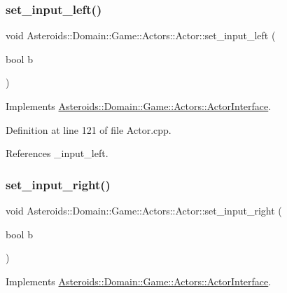 \subsubsection{\texorpdfstring{set\+\_\+input\+\_\+left()}{set\_input\_left()}}
{\footnotesize\ttfamily void Asteroids\+::\+Domain\+::\+Game\+::\+Actors\+::\+Actor\+::set\+\_\+input\+\_\+left (\begin{DoxyParamCaption}\item[{bool}]{b }\end{DoxyParamCaption})\hspace{0.3cm}{\ttfamily [virtual]}}



Implements \hyperlink{classAsteroids_1_1Domain_1_1Game_1_1Actors_1_1ActorInterface_a2871052707d65e47a71da67234fc6f93}{Asteroids\+::\+Domain\+::\+Game\+::\+Actors\+::\+Actor\+Interface}.



Definition at line 121 of file Actor.\+cpp.



References \+\_\+input\+\_\+left.

\mbox{\label{classAsteroids_1_1Domain_1_1Game_1_1Actors_1_1Actor_a6d6074e20ae4461eec4f46226d86ffa2}} 
\subsubsection{\texorpdfstring{set\+\_\+input\+\_\+right()}{set\_input\_right()}}
{\footnotesize\ttfamily void Asteroids\+::\+Domain\+::\+Game\+::\+Actors\+::\+Actor\+::set\+\_\+input\+\_\+right (\begin{DoxyParamCaption}\item[{bool}]{b }\end{DoxyParamCaption})\hspace{0.3cm}{\ttfamily [virtual]}}



Implements \hyperlink{classAsteroids_1_1Domain_1_1Game_1_1Actors_1_1ActorInterface_a9d63b00cc69e5dfec1baa65faaa6cf15}{Asteroids\+::\+Domain\+::\+Game\+::\+Actors\+::\+Actor\+Interface}.



